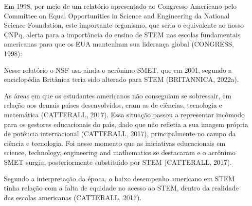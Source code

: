 \documentclass[
12pt,		%
openright,	%
twoside,  %
a4paper,			%
chapter=TITLE,		%
english,			%
french,				%
spanish,			%
brazil				%
]{USPSC-classe/USPSC}
\begin{document}
Em 1998, por meio de um relat\'orio apresentado ao Congresso Americano pelo Committee on Equal Opportunities in Science and Engineering da National Science Foundation, este importante organismo, que seria o equivalente ao nosso CNPq, alerta para a import\^ancia do ensino de STEM nas escolas fundamentais americanas para que os EUA mantenham sua lideran\c{c}a global  (CONGRESS, 1998):





\noindent\begin{center}\mbox{\centering{}}\end{center}


Nesse relat\'orio o NSF usa ainda o acr\^onimo SMET, que em 2001, segundo a enciclop\'edia Brit\^anica teria sido alterado para STEM  (BRITANNICA, 2022a).




As \'areas em que os estudantes americanos n\~ao conseguiam se sobressair, em rela\c{c}\~ao aos demais pa\'{\i}ses desenvolvidos, eram as de ci\^encias, tecnologia e matem\'atica  (CATTERALL, 2017). Essa situa\c{c}\~ao passou a representar inc\^omodo para os gestores educacionais do pa\'{\i}s, dado que n\~ao refletia a sua imagem pr\'opria de pot\^encia internacional  (CATTERALL, 2017), principalmente no campo da ci\^encia e tecnologia. Foi nesse momento que as iniciativas educacionais em \textquotedbl science, technology, engineering and mathematics se destacaram e o acr\^onimo SMET surgiu, posteriormente substitu\'{\i}do por STEM  (CATTERALL, 2017).




Segundo a interpreta\c{c}\~ao da \'epoca, o baixo desempenho americano em STEM tinha rela\c{c}\~ao com a falta de equidade no acesso ao STEM, dentro da realidade das escolas americanas  (CATTERALL, 2017).
\end{document}
